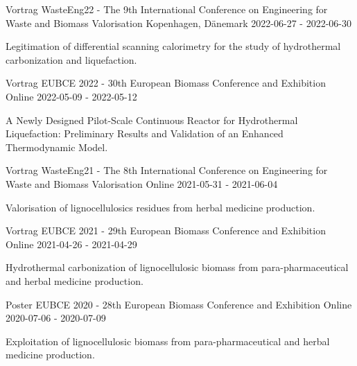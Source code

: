 
\begin{cventries}

\cventry
{Vortrag}
{WasteEng22 - The 9th International Conference on Engineering for Waste and Biomass Valorisation}
{Kopenhagen, Dänemark}
{2022-06-27 - 2022-06-30}
{\vspace{-4.0mm}
\begin{justify}
\begin{itemize}[leftmargin=0ex, nosep, noitemsep]
\setlength{\parskip}{0pt}
\renewcommand{\labelitemi}{\bullet}
{Legitimation of differential scanning calorimetry for the study of hydrothermal carbonization and liquefaction.}
\end{itemize}
\end{justify}}
\cventry
{Vortrag}
{EUBCE 2022 - 30th European Biomass Conference and Exhibition}
{Online}
{2022-05-09 - 2022-05-12}
{\vspace{-4.0mm}
\begin{justify}
\begin{itemize}[leftmargin=0ex, nosep, noitemsep]
\setlength{\parskip}{0pt}
\renewcommand{\labelitemi}{\bullet}
{A Newly Designed Pilot-Scale Continuous Reactor for Hydrothermal Liquefaction: Preliminary Results and Validation of an Enhanced Thermodynamic Model.}
\end{itemize}
\end{justify}}
\cventry
{Vortrag}
{WasteEng21 - The 8th International Conference on Engineering for Waste and Biomass Valorisation}
{Online}
{2021-05-31 - 2021-06-04}
{\vspace{-4.0mm}
\begin{justify}
\begin{itemize}[leftmargin=0ex, nosep, noitemsep]
\setlength{\parskip}{0pt}
\renewcommand{\labelitemi}{\bullet}
{Valorisation of lignocellulosics residues from herbal medicine production.}
\end{itemize}
\end{justify}}
\cventry
{Vortrag}
{EUBCE 2021 - 29th European Biomass Conference and Exhibition}
{Online}
{2021-04-26 - 2021-04-29}
{\vspace{-4.0mm}
\begin{justify}
\begin{itemize}[leftmargin=0ex, nosep, noitemsep]
\setlength{\parskip}{0pt}
\renewcommand{\labelitemi}{\bullet}
{Hydrothermal carbonization of lignocellulosic biomass from para-pharmaceutical and herbal medicine production.}
\end{itemize}
\end{justify}}
\cventry
{Poster}
{EUBCE 2020 - 28th European Biomass Conference and Exhibition}
{Online}
{2020-07-06 - 2020-07-09}
{\vspace{-4.0mm}
\begin{justify}
\begin{itemize}[leftmargin=0ex, nosep, noitemsep]
\setlength{\parskip}{0pt}
\renewcommand{\labelitemi}{\bullet}
{Exploitation of lignocellulosic biomass from para-pharmaceutical and herbal medicine production.}
\end{itemize}
\end{justify}}
\end{cventries}